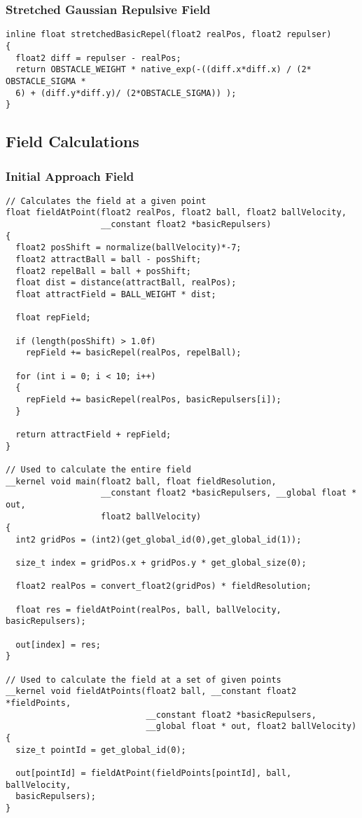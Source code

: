 \subsubsection{Stretched Gaussian Repulsive
Field\label{app:stretchedGaussianRepulsive}}

\begin{lstlisting}
inline float stretchedBasicRepel(float2 realPos, float2 repulser)
{
  float2 diff = repulser - realPos;
  return OBSTACLE_WEIGHT * native_exp(-((diff.x*diff.x) / (2* OBSTACLE_SIGMA *
  6) + (diff.y*diff.y)/ (2*OBSTACLE_SIGMA)) ); 
}
\end{lstlisting}

\subsection{Field Calculations}

\subsubsection{Initial Approach Field\label{app:initialApproachField}}

\begin{lstlisting}
// Calculates the field at a given point
float fieldAtPoint(float2 realPos, float2 ball, float2 ballVelocity, 
                   __constant float2 *basicRepulsers)
{
  float2 posShift = normalize(ballVelocity)*-7;
  float2 attractBall = ball - posShift;
  float2 repelBall = ball + posShift;
  float dist = distance(attractBall, realPos);
  float attractField = BALL_WEIGHT * dist;

  float repField;

  if (length(posShift) > 1.0f)
    repField += basicRepel(realPos, repelBall);

  for (int i = 0; i < 10; i++)
  {
    repField += basicRepel(realPos, basicRepulsers[i]);
  }

  return attractField + repField;
}

// Used to calculate the entire field
__kernel void main(float2 ball, float fieldResolution, 
                   __constant float2 *basicRepulsers, __global float * out,
                   float2 ballVelocity) 
{
  int2 gridPos = (int2)(get_global_id(0),get_global_id(1));

  size_t index = gridPos.x + gridPos.y * get_global_size(0);

  float2 realPos = convert_float2(gridPos) * fieldResolution;

  float res = fieldAtPoint(realPos, ball, ballVelocity, basicRepulsers);

  out[index] = res;
}

// Used to calculate the field at a set of given points
__kernel void fieldAtPoints(float2 ball, __constant float2 *fieldPoints, 
                            __constant float2 *basicRepulsers, 
                            __global float * out, float2 ballVelocity) 
{
  size_t pointId = get_global_id(0);

  out[pointId] = fieldAtPoint(fieldPoints[pointId], ball, ballVelocity,
  basicRepulsers); 
}
\end{lstlisting}

